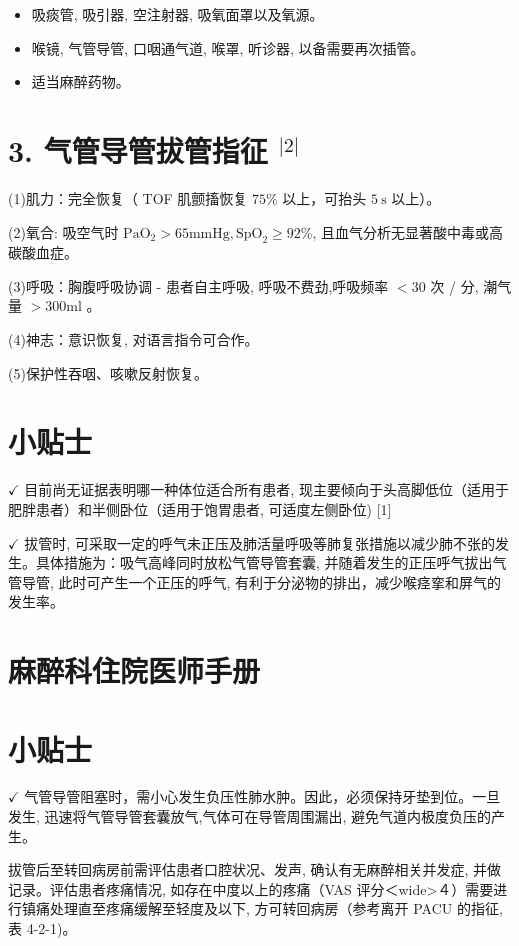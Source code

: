 \documentclass[10pt]{article}
\begin{document}
\begin{itemize}
  \item 吸痰管, 吸引器, 空注射器, 吸氧面罩以及氧源。
  \item 喉镜, 气管导管, 口咽通气道, 喉罩, 听诊器, 以备需要再次插管。
  \item 适当麻醉药物。
\end{itemize}

\section*{3. 气管导管拔管指征 ${ }^{|2|}$}
(1)肌力：完全恢复（ TOF 肌颤搐恢复 $75 \%$ 以上，可抬头 $5 \mathrm{~s}$ 以上）。

(2)氧合: 吸空气时 $\mathrm{PaO}_{2}>65 \mathrm{mmHg}, \mathrm{SpO}_{2} \geqslant 92 \%$, 且血气分析无显著酸中毒或高碳酸血症。

(3)呼吸：胸腹呼吸协调 - 患者自主呼吸, 呼吸不费劲,呼吸频率 $<30$ 次 / 分, 潮气量 $>300 \mathrm{ml}$ 。

(4)神志：意识恢复, 对语言指令可合作。

(5)保护性吞咽、咳嗽反射恢复。

\section*{小贴士}
$\checkmark$ 目前尚无证据表明哪一种体位适合所有患者, 现主要倾向于头高脚低位（适用于肥胖患者）和半侧卧位（适用于饱胃患者, 可适度左侧卧位) [1]

$\checkmark$ 拔管时, 可采取一定的呼气未正压及肺活量呼吸等肺复张措施以减少肺不张的发生。具体措施为：吸气高峰同时放松气管导管套囊, 并随着发生的正压呼气拔出气管导管, 此时可产生一个正压的呼气, 有利于分泌物的排出，减少喉痉挛和屏气的发生率。

\section*{麻醉科住院医师手册}
\section*{小贴士}
$\checkmark$ 气管导管阻塞时，需小心发生负压性肺水肿。因此，必须保持牙垫到位。一旦发生, 迅速将气管导管套囊放气,气体可在导管周围漏出, 避免气道内极度负压的产生。

拔管后至转回病房前需评估患者口腔状况、发声, 确认有无麻醉相关并发症, 并做记录。评估患者疼痛情况, 如存在中度以上的疼痛（VAS 评分＜wide>４）需要进行镇痛处理直至疼痛缓解至轻度及以下, 方可转回病房（参考离开 PACU 的指征, 表 4-2-1)。
\end{document}
